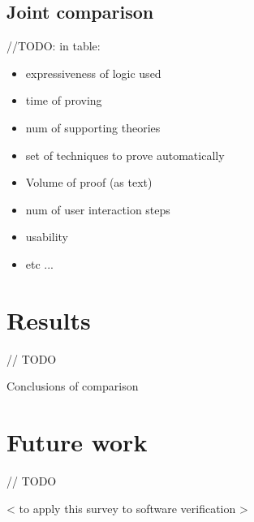\documentclass[article]{aaltoseries}
\begin{document}

\subsection{Joint comparison}
\label{sec:joint_comparison}

//TODO: in table:
\begin{itemize}
	\itemsep0em
	\item expressiveness of logic used
	\item time of proving
	\item num of supporting theories
	\item set of techniques to prove automatically
	\item Volume of proof (as text)
	\item num of user interaction steps
	\item usability
	\item etc ...
\end{itemize}


\section{Results}
\label{sec:results}

// TODO

Conclusions of comparison


\section{Future work}
\label{sec:future_work}

// TODO

< to apply this survey to software verification >






\end{document}
